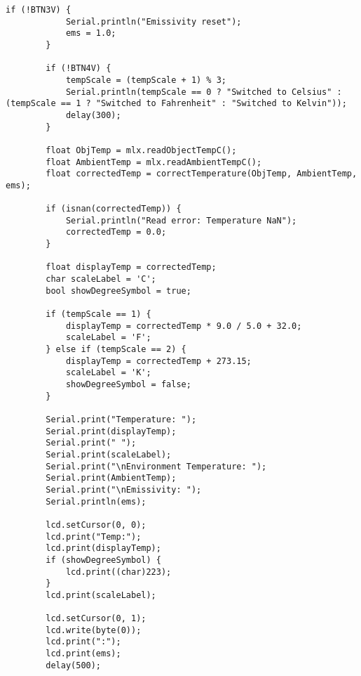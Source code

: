 \begin{lstlisting}[style=mystyle]
        if (!BTN3V) {
            Serial.println("Emissivity reset");
            ems = 1.0;
        }
    
        if (!BTN4V) {
            tempScale = (tempScale + 1) % 3;
            Serial.println(tempScale == 0 ? "Switched to Celsius" : (tempScale == 1 ? "Switched to Fahrenheit" : "Switched to Kelvin"));
            delay(300);
        }
    
        float ObjTemp = mlx.readObjectTempC();
        float AmbientTemp = mlx.readAmbientTempC();
        float correctedTemp = correctTemperature(ObjTemp, AmbientTemp, ems);
    
        if (isnan(correctedTemp)) {
            Serial.println("Read error: Temperature NaN");
            correctedTemp = 0.0;
        }
    
        float displayTemp = correctedTemp;
        char scaleLabel = 'C';
        bool showDegreeSymbol = true;
    
        if (tempScale == 1) {
            displayTemp = correctedTemp * 9.0 / 5.0 + 32.0;
            scaleLabel = 'F';
        } else if (tempScale == 2) {
            displayTemp = correctedTemp + 273.15;
            scaleLabel = 'K';
            showDegreeSymbol = false;
        }
    
        Serial.print("Temperature: ");
        Serial.print(displayTemp);
        Serial.print(" ");
        Serial.print(scaleLabel);
        Serial.print("\nEnvironment Temperature: ");
        Serial.print(AmbientTemp);
        Serial.print("\nEmissivity: ");
        Serial.println(ems);
    
        lcd.setCursor(0, 0);
        lcd.print("Temp:");
        lcd.print(displayTemp);
        if (showDegreeSymbol) {
            lcd.print((char)223);
        }
        lcd.print(scaleLabel);
    
        lcd.setCursor(0, 1);
        lcd.write(byte(0));
        lcd.print(":");
        lcd.print(ems);
        delay(500);
    \end{lstlisting}